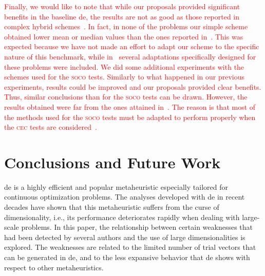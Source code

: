 \documentclass[preprint,3p]{elsarticle}
\newcommand{\DE}{{\sc de}}
\begin{document}
%
\textcolor{red}{
Finally, we would like to note that while our proposals provided significant benefits in the baseline \DE{},
the results are not as good as those reported in complex hybrid schemes~\cite{Brest:12,LaTorre:12}. 
%
In fact, in none of the problems our simple scheme obtained lower mean or median values than the ones reported in~\cite{Brest:12}.
%
This was expected because we have not made an effort to adapt our scheme to the specific nature of this benchmark,
while in~\cite{Brest:12} several adaptations specifically designed for these problems were included.
%
%
We did some additional experiments with the schemes used for the \textsc{soco} tests.
%
Similarly to what happened in our previous experiments, results could be improved and our proposals provided clear benefits.
%
Thus, similar conclusions than for the \textsc{soco} tests can be drawn.
%
However, the results obtained were far from the ones attained in~\cite{Brest:12}.
%
The reason is that most of the methods used for the \textsc{soco} tests must be adapted to perform properly when the \textsc{cec}
tests are considered~\cite{LaTorre:14}.
}
%

\section{Conclusions and Future Work}
\label{sec:conc}

\DE{} is a highly efficient and popular metaheuristic especially tailored for continuous optimization problems.
%
The analyses developed with \DE{} in recent decades have shown that this metaheuristic suffers from
the curse of dimensionality, i.e., its performance deteriorates rapidly when dealing with large-scale problems.
%
In this paper, the relationship between certain weaknesses that had been detected by several authors and the use
of large dimensionalities is explored.
%
The weaknesses are related to the limited number of trial vectors that can be generated in \DE{}, and to the
less expansive behavior that \DE{} shows with respect to other metaheuristics.
\end{document}
